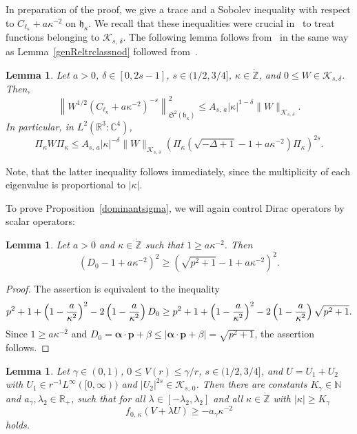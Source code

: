 \documentclass[10pt]{amsart}
\newtheorem{lemm}[cdrthm]{Lemma}
\theoremstyle{definition}
\newcommand*\cz{\mathbb{C}}
\newcommand*\nz{\mathbb{N}}
\newcommand*\gz{\mathbb{Z}}
\newcommand*\rz{\mathbb{R}}
\newcommand*\zp{\dot{\gz}}
\newcommand*\cK{\mathcal{K}}
\newcommand*\gh{\mathfrak{h}}
\newcommand*\gS{\mathfrak{S}}
\newcommand*\balpha{\bm{\alpha}}
\newcommand*\bp{\bm{p}}
\begin{document}
In preparation of the proof, we give a trace and a Sobolev inequality with respect to $C_{\ell_\kappa}+a \kappa^{-2}$ on $\gh_\kappa$. We recall that these inequalities were crucial in~\cite{Franketal2020P} to treat functions belonging to $\cK_{s,\,\delta}$. The following lemma follows from~\cite[Proposition~5.2]{Franketal2020P} in the same way as Lemma~\ref{genReltrclassnod} followed from~\cite[Proposition~4.4]{Franketal2020P}.

\begin{lemm}\label{genReltrclass}
Let $a>0$, $\delta\in[0,2s-1]$, $s\in(1/2,3/4]$, $\kappa\in\zp$, and $0\leq W \in\cK_{s,\delta}$. Then,
\begin{equation}\label{eq:genReltrclass}
\left\|W^{1/2}\left(C_{\ell_\kappa}+a\kappa^{-2}\right)^{-s}\right\|_{\gS^2\left(\gh_{\kappa}\right)}^2
\leq A_{s,\,a} |\kappa|^{1-\delta}\|W\|_{\cK_{s,\,\delta}}.
\end{equation}
In particular, in $L^2(\rz^3:\cz^4)$,
\begin{equation}\label{eq:genSobolevDual}
\Pi_{\kappa}W\Pi_{\kappa}
\leq A_{s,\,a} |\kappa|^{-\delta}\|W\|_{\cK_{s,\,\delta}} \left(\Pi_{\kappa}\left(\sqrt{-\Delta+1}-1+a\kappa^{-2}\right)\Pi_{\kappa}\right)^{2s}.
\end{equation}
\end{lemm}

Note, that the latter inequality follows immediately, since the multiplicity of each eigenvalue is proportional to $|\kappa|$.

To prove Proposition~\ref{dominantsigma}, we will again control Dirac operators by scalar operators:
\begin{lemm}\label{boundkineticenergy}
Let $a>0$ and $\kappa\in\zp$ such that $1\geq a \kappa^{-2}$. Then
\[
\left(D_0-1+a \kappa^{-2}\right)^2 \geq \left(\sqrt{p^2+1}-1+a \kappa^{-2}\right)^2.
\]
\end{lemm}

\begin{proof}
The assertion is equivalent to the inequality
\[
p^2+1+\left(1-\frac a{\kappa^2}\right)^2-2\left(1-\frac a{\kappa^2}\right)D_0\\
\geq p^2+1+\left(1-\frac a{\kappa^2}\right)^2-2\left(1-\frac a{\kappa^2}\right)\sqrt{p^2+1}.
\]
Since $1\geq a \kappa^{-2}$ and $D_0=\balpha\cdot\bp+\beta \leq |\balpha\cdot\bp+\beta|=\sqrt{p^2+1}$, the assertion follows.
\end{proof}

\begin{lemm}\label{boundA}
Let $\gamma\in(0,1)$, $0\leq V(r)\leq\gamma/r$, $s\in(1/2,3/4]$, and $U=U_1+U_2$ with $U_1\in r^{-1}L^\infty([0,\infty))$ and $|U_2|^{2s}\in \cK_{s,\,0}$. Then there are constants $K_{\gamma}\in\nz$ and $a_\gamma,\lambda_2\in \rz_+$, such that for all $\lambda\in[-\lambda_2, \lambda_2]$ and all $\kappa\in\zp$ with $|\kappa|\geq K_\gamma$
\begin{equation}\label{agamma}
f_{0,\,\kappa}(V+\lambda U) \geq -a_\gamma \kappa^{-2}
\end{equation}
holds.
\end{lemm}
\end{document}

